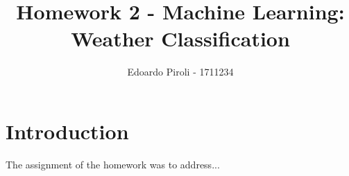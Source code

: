 \documentclass[a4paper]{article}
\title{Homework 2 - Machine Learning: Weather Classification}
\author{Edoardo Piroli - 1711234}
\begin{document}
\maketitle
\thispagestyle{empty}

\newpage
\tableofcontents
\thispagestyle{empty}
\newpage


\section{Introduction}
The assignment of the homework was to address...
\end{document}
